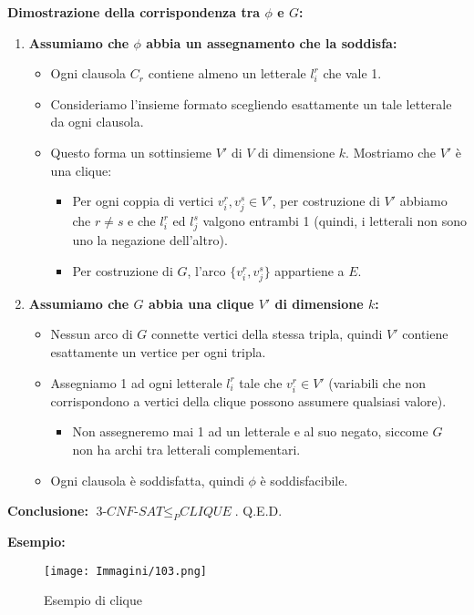 \documentclass{article}
\begin{document}
\textbf{Dimostrazione della corrispondenza tra $\phi$ e $G$:}
\begin{enumerate}
    \item \textbf{Assumiamo che $\phi$ abbia un assegnamento che la soddisfa:}
    \begin{itemize}
        \item Ogni clausola $C_r$ contiene almeno un letterale $l_i^r$ che vale 1.
        \item Consideriamo l’insieme formato scegliendo esattamente un tale letterale da ogni clausola.
        \item Questo forma un sottinsieme $V'$ di $V$ di dimensione $k$. Mostriamo che $V'$ è una clique:
        \begin{itemize}
            \item Per ogni coppia di vertici $v_i^r, v_j^s \in V'$, per costruzione di $V'$ abbiamo che $r \neq s$ e che $l_i^r$ ed $l_j^s$ valgono entrambi 1 (quindi, i letterali non sono uno la negazione dell’altro).
            \item Per costruzione di $G$, l’arco $\{v_i^r, v_j^s\}$ appartiene a $E$.
        \end{itemize}
    \end{itemize}
    
    \item \textbf{Assumiamo che $G$ abbia una clique $V'$ di dimensione $k$:}
    \begin{itemize}
        \item Nessun arco di $G$ connette vertici della stessa tripla, quindi $V'$ contiene esattamente un vertice per ogni tripla.
        \item Assegniamo 1 ad ogni letterale $l_i^r$ tale che $v_i^r \in V'$ (variabili che non corrispondono a vertici della clique possono assumere qualsiasi valore).
        \begin{itemize}
            \item Non assegneremo mai 1 ad un letterale e al suo negato, siccome $G$ non ha archi tra letterali complementari.
        \end{itemize}
        \item Ogni clausola è soddisfatta, quindi $\phi$ è soddisfacibile.
    \end{itemize}
\end{enumerate}
\textbf{Conclusione:} $\textit{3-CNF-SAT} \leq_P \textit{CLIQUE}$. Q.E.D.

\newpage
\textbf{Esempio:}
\begin{figure}[H]
    \centering
    \texttt{[image: Immagini/103.png]}
    \caption{Esempio di clique}
    \label{fig:clique-example-2}
\end{figure}
\end{document}
